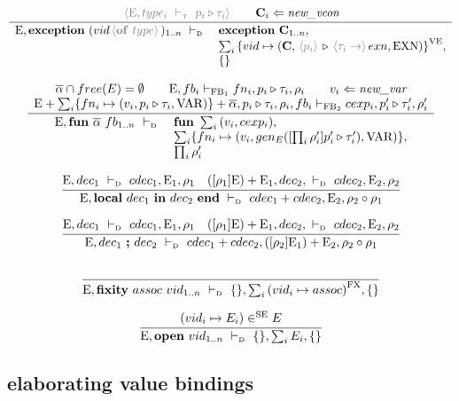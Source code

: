 \documentclass[11pt,a4paper]{article}
\newcommand{\key}[1]{\textrm{\textbf{#1}}}
\newcommand{\qualtype}[2]{#1 \triangleright #2}
\newcommand{\braced}[1]{\{#1\}}
\newcommand{\angled}[1]{\,{\color{gray}\langle#1\rangle}\,}
\newcommand{\compose}[2]{#1 \circ #2}
\newcommand{\Env}  {\textrm{E}}
\newcommand{\VE}   {\textrm{VE}}
\newcommand{\SE}   {\textrm{SE}}
\newcommand{\FB}   {\textrm{FB}}
\newcommand{\FX}   {\textrm{FX}}
\newcommand{\VKE}  {\textrm{EXN}}
\newcommand{\VKV}  {\textrm{VAR}}
\newcommand{\vcon} {\mathbf{C}}
\newcommand{\Empty}{\braced{}}
\newcommand{\vdashD}  {\ \vdash_{\textrm{\tiny D}}\  }
\newcommand{\vdashT}  {\ \vdash_{\textrm{\tiny T}}\  }
\newcommand{\corenew}[1]{\textit{new\_#1}}
\begin{document}
\[
\cfrac
 {\angled{\Env,type_i \vdashT \qualtype{p_i}{\tau_i}} \qquad \vcon_i\Leftarrow\corenew{vcon}}
 {\begin{array}{ll}
  \Env, \key{exception}\ (vid \angled{\key{of}\ type})_{1..n} \vdashD & \key{exception}\ \vcon_{1..n}, \\
  & \sum_i{\braced{vid \mapsto (\vcon, \qualtype{\angled{p_i}}{\angled{\tau_i \to} exn, \VKE)}}}^\VE , \\
  & \Empty \\
  \end{array}}
\]

\[
\cfrac
 {\begin{array}{c}
  \overline{\alpha} \cap free(E) = \emptyset \qquad 
  \Env,fb_i\vdash_{\FB_1} fn_i,\qualtype{p_i}{\tau_i},\rho_i \qquad 
  v_i\Leftarrow\corenew{var}			     \\
  \Env+\sum_i\braced{fn_i \mapsto (v_i, \qualtype{p_i}{\tau_i}, \VKV)} + \overline{\alpha}, \qualtype{p_i}{\tau_i}, \rho_i, fb_i 
    \vdash_{\FB_2} cexp_i, \qualtype{p_i'}{\tau_i'}, \rho_i' \\
  \end{array}}
 {\begin{array}{ll}
  \Env, \key{fun}\ \overline{\alpha}\ fb_{1..n} \vdashD
  & \key{fun}\ \sum_i{(v_i, cexp_i)}, \\
  & \sum_i\braced{fn_i \mapsto (v_i, gen_E([\prod_i{\rho_i'}]\qualtype{p_i'}{\tau_i'}),\VKV)}, \\
  & \prod_i{\rho_i'} \\
  \end{array}}
\]

\[
\cfrac
 {\Env, dec_1 \vdashD cdec_1, \Env_1, \rho_1    \quad
  ([\rho_1]\Env) + \Env_1, dec_2,\vdashD cdec_2, \Env_2, \rho_2}
 {\Env, \key{local}\ dec_1\ \key{in}\ dec_2\ \key{end} \vdashD cdec_1+cdec_2, \Env_2, \compose{\rho_2}{\rho_1}}
\]

\[
\cfrac
 {\Env, dec_1 \vdashD cdec_1, \Env_1, \rho_1    \quad
  ([\rho_1]\Env) + \Env_1, dec_2,\vdashD cdec_2, \Env_2, \rho_2}
 {\Env, dec_1\ \key{;}\ dec_2 \vdashD cdec_1+cdec_2, ([\rho_2]\Env_1)+\Env_2, \compose{\rho_2}{\rho_1}}
\]

\[
\cfrac
 {}
 {\Env,\key{fixity}\ assoc\ vid_{1..n} \vdashD \Empty, \sum_i{(vid_i \mapsto assoc)}^\FX ,\Empty}
\]

\[
\cfrac
 {(vid_i \mapsto E_i) \in^\SE E}
 {\Env,\key{open}\ vid_{1..n} \vdashD \Empty, \sum_i{E_i} ,\Empty}
\]

\subsection {elaborating value bindings}
\end{document}

